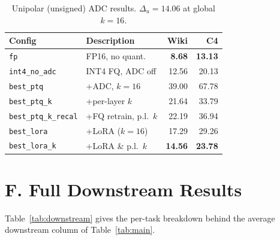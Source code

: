 \documentclass[letterpaper]{article} %
\theoremstyle{plain}
\begin{document}
\begin{table}[htbp]
\centering
\setlength{\tabcolsep}{4pt}
\begin{tabular}{@{}llrr@{}}
\toprule
\textbf{Config} & \textbf{Description} & \textbf{Wiki} & \textbf{C4} \\
\midrule
\texttt{fp}                 & FP16, no quant.        & \textbf{8.68}  & \textbf{13.13} \\
\texttt{int4\_no\_adc}      & INT4 FQ, ADC off       & 12.56          & 20.13 \\
\texttt{best\_ptq}          & +ADC, $k{=}16$         & 39.00          & 67.78 \\
\texttt{best\_ptq\_k}       & +per-layer $k$         & 21.64          & 33.79 \\
\texttt{best\_ptq\_k\_recal}& +FQ retrain, p.l.\ $k$ & 22.19          & 36.94 \\
\texttt{best\_lora}         & +LoRA ($k{=}16$)       & 17.29          & 29.26 \\
\texttt{best\_lora\_k}      & +LoRA \& p.l.\ $k$     & \textbf{14.56} & \textbf{23.78} \\
\bottomrule
\end{tabular}
\caption{Unipolar (unsigned) ADC results. $\Delta_u = 14.06$ at global $k = 16$.}
\label{tab:unipolar}
\end{table}

\section{F. Full Downstream Results}

Table~\ref{tab:downstream} gives the per-task breakdown behind the average downstream column of Table~\ref{tab:main}.
\end{document}

